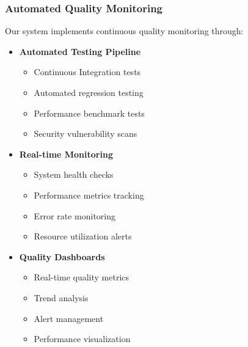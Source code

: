 \documentclass[12pt,a4paper]{report}
\begin{document}
\subsubsection{Automated Quality Monitoring}
Our system implements continuous quality monitoring through:
\begin{itemize}
    \item \textbf{Automated Testing Pipeline}
    \begin{itemize}
        \item Continuous Integration tests
        \item Automated regression testing
        \item Performance benchmark tests
        \item Security vulnerability scans
    \end{itemize}
    
    \item \textbf{Real-time Monitoring}
    \begin{itemize}
        \item System health checks
        \item Performance metrics tracking
        \item Error rate monitoring
        \item Resource utilization alerts
    \end{itemize}
    
    \item \textbf{Quality Dashboards}
    \begin{itemize}
        \item Real-time quality metrics
        \item Trend analysis
        \item Alert management
        \item Performance visualization
    \end{itemize}
\end{itemize}
\end{document}
